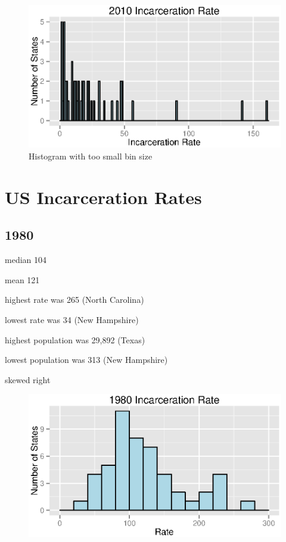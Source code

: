 \documentclass{exam}
\begin{document}
  \begin{figure}[H]
    \centering
    \includegraphics[scale = 0.9]{figures/population_histogram_2010_small_bins.eps}
    \caption{Histogram with too small bin size}
  \end{figure}

  \section{US Incarceration Rates}

  \subsection{1980}

  \begin{itemize*}
    \item median 104
    \item mean 121
    \item highest rate was 265 (North Carolina)
    \item lowest rate was 34 (New Hampshire)
    \item highest population was 29,892 (Texas)
    \item lowest population was 313 (New Hampshire)
    \item skewed right
  \end{itemize*}

  \begin{figure}[H]
    \centering
    \includegraphics[scale = 0.9]{figures/rate_histogram_1980.eps}
  \end{figure}
\end{document}
